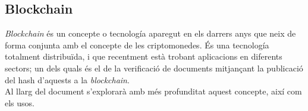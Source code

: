 \subsection{Blockchain}
\textit{Blockchain} és un concepte o tecnología aparegut en els darrers anys que neix de forma conjunta amb el concepte de les criptomonedes.
És una tecnología totalment distribuïda, i que recentment està trobant aplicacions en diferents sectors; un dels quals és el de la verificació de documents mitjançant la publicació del hash d'aquests a la \textit{blockchain}.\\
\newline Al llarg del document s'explorarà amb més profunditat aquest concepte, així com els usos.















